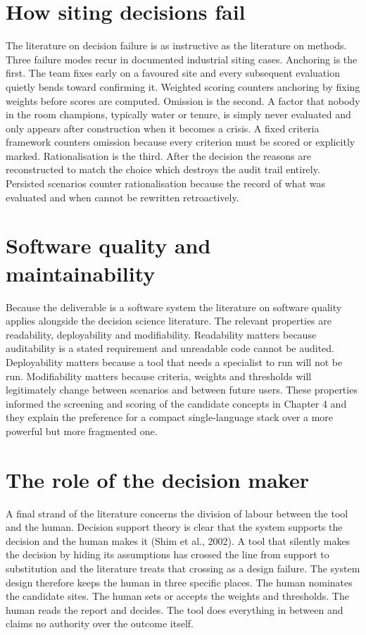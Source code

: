 \documentclass[12pt,a4paper]{report}
\begin{document}
\section{How siting decisions fail}
The literature on decision failure is as instructive as the literature
on methods. Three failure modes recur in documented industrial siting
cases. Anchoring is the first. The team fixes early on a favoured
site and every subsequent evaluation quietly bends toward confirming
it. Weighted scoring counters anchoring by fixing weights before
scores are computed. Omission is the second. A factor that nobody in
the room champions, typically water or tenure, is simply never
evaluated and only appears after construction when it becomes a
crisis. A fixed criteria framework counters omission because every
criterion must be scored or explicitly marked. Rationalisation is the
third. After the decision the reasons are reconstructed to match the
choice which destroys the audit trail entirely. Persisted scenarios
counter rationalisation because the record of what was evaluated and
when cannot be rewritten retroactively.

\section{Software quality and maintainability}
Because the deliverable is a software system the literature on
software quality applies alongside the decision science literature.
The relevant properties are readability, deployability and
modifiability. Readability matters because auditability is a stated
requirement and unreadable code cannot be audited. Deployability
matters because a tool that needs a specialist to run will not be run.
Modifiability matters because criteria, weights and thresholds will
legitimately change between scenarios and between future users. These
properties informed the screening and scoring of the candidate
concepts in Chapter 4 and they explain the preference for a compact
single-language stack over a more powerful but more fragmented one.

\section{The role of the decision maker}
A final strand of the literature concerns the division of labour
between the tool and the human. Decision support theory is clear that
the system supports the decision and the human makes it (Shim et al.,
2002). A tool that silently makes the decision by hiding its
assumptions has crossed the line from support to substitution and the
literature treats that crossing as a design failure. The system design
therefore keeps the human in three specific places. The human
nominates the candidate sites. The human sets or accepts the weights
and thresholds. The human reads the report and decides. The tool does
everything in between and claims no authority over the outcome itself.
\end{document}
